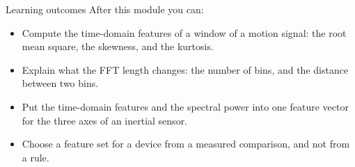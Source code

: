 \begin{frame}{Learning outcomes}
  After this module you can:
  \begin{itemize}
    \item Compute the time-domain features of a window of a motion signal:
          the root mean square, the skewness, and the kurtosis.
    \item Explain what the FFT length changes: the number of bins, and the
          distance between two bins.
    \item Put the time-domain features and the spectral power into one
          feature vector for the three axes of an inertial sensor.
    \item Choose a feature set for a device from a measured comparison, and
          not from a rule.
  \end{itemize}
\end{frame}